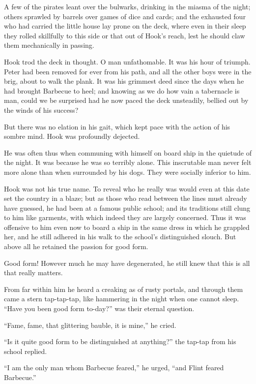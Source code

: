 A few of the pirates leant over the bulwarks, drinking in the miasma of
the night; others sprawled by barrels over games of dice and cards; and
the exhausted four who had carried the little house lay prone on the
deck, where even in their sleep they rolled skillfully to this side or
that out of Hook's reach, lest he should claw them mechanically in
passing.

Hook trod the deck in thought. O man unfathomable. It was his hour of
triumph. Peter had been removed for ever from his path, and all the
other boys were in the brig, about to walk the plank. It was his
grimmest deed since the days when he had brought Barbecue to heel; and
knowing as we do how vain a tabernacle is man, could we be surprised
had he now paced the deck unsteadily, bellied out by the winds of his
success?

But there was no elation in his gait, which kept pace with the action
of his sombre mind. Hook was profoundly dejected.

He was often thus when communing with himself on board ship in the
quietude of the night. It was because he was so terribly alone. This
inscrutable man never felt more alone than when surrounded by his dogs.
They were socially inferior to him.

Hook was not his true name. To reveal who he really was would even at
this date set the country in a blaze; but as those who read between the
lines must already have guessed, he had been at a famous public school;
and its traditions still clung to him like garments, with which indeed
they are largely concerned. Thus it was offensive to him even now to
board a ship in the same dress in which he grappled her, and he still
adhered in his walk to the school's distinguished slouch. But above all
he retained the passion for good form.

Good form! However much he may have degenerated, he still knew that
this is all that really matters.

From far within him he heard a creaking as of rusty portals, and
through them came a stern tap-tap-tap, like hammering in the night when
one cannot sleep. ``Have you been good form to-day?'' was their eternal
question.

``Fame, fame, that glittering bauble, it is mine,'' he cried.

``Is it quite good form to be distinguished at anything?'' the tap-tap
from his school replied.

``I am the only man whom Barbecue feared,'' he urged, ``and Flint feared
Barbecue.''

